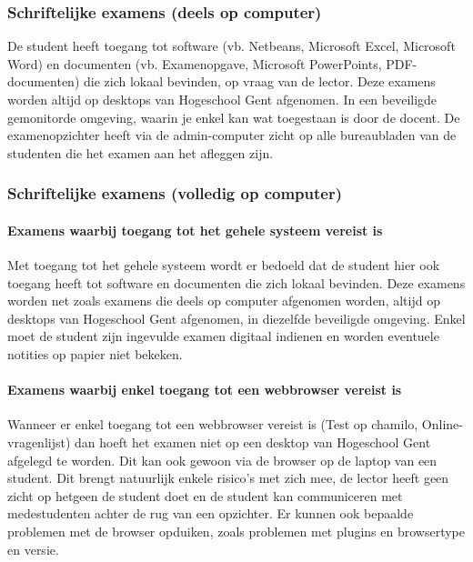 \subsubsection{Schriftelijke examens (deels op computer) }

De student heeft toegang tot software (vb. Netbeans, Microsoft Excel, Microsoft Word) en documenten (vb. Examenopgave, Microsoft PowerPoints, PDF-documenten) die zich lokaal bevinden, op vraag van de lector. Deze examens worden altijd op desktops van Hogeschool Gent afgenomen. In een beveiligde gemonitorde omgeving, waarin je enkel kan wat toegestaan is door de docent. De examenopzichter heeft via de admin-computer zicht op alle bureaubladen van de studenten die het examen aan het afleggen zijn. 




\subsubsection{Schriftelijke examens (volledig op computer)}

\paragraph{Examens waarbij toegang tot het gehele systeem vereist is}

Met toegang tot het gehele systeem wordt er bedoeld dat de student hier ook toegang heeft tot software  en documenten die zich lokaal bevinden. Deze examens worden net zoals examens die deels op computer afgenomen worden, altijd op desktops van Hogeschool Gent afgenomen, in diezelfde beveiligde omgeving. Enkel moet de student zijn ingevulde examen digitaal indienen en worden eventuele notities op papier niet bekeken.  

\paragraph{Examens waarbij enkel toegang tot een webbrowser vereist is}

Wanneer er enkel toegang tot een webbrowser vereist is (Test op chamilo, Online-vragenlijst) dan hoeft het examen niet op een desktop van Hogeschool Gent afgelegd te worden. Dit kan ook gewoon via de browser op de laptop van een student. Dit brengt natuurlijk enkele risico's met zich mee, de lector heeft geen zicht op hetgeen de student doet en de student kan communiceren met medestudenten achter de rug van een opzichter. Er kunnen ook bepaalde problemen met de browser opduiken, zoals problemen met plugins en browsertype en versie. 

